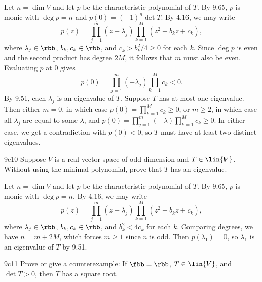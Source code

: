 \begin{sol}
    Let $n = \dim V$ and let $p$ be the characteristic polynomial of $T$.
    By 9.65, $p$ is monic with $\deg p = n$ and $p(0) = (-1)^n \det T$.
    By 4.16, we may write
    \[
        p(z) = \prod_{j=1}^m (z - \lambda_j) \prod_{k=1}^M (z^2 + b_k z + c_k),
    \]
    where $\lambda_j \in \rbb$, $b_k, c_k \in \rbb$, and $c_k > b_k^2/4 \geq 0$ for each $k$.
    Since $\deg p$ is even and the second product has degree $2M$, it follows that $m$ must also be even.
    Evaluating $p$ at $0$ gives
    \[
        p(0) = \prod_{j=1}^m (-\lambda_j) \prod_{k=1}^M c_k < 0.
    \]
    By 9.51, each $\lambda_j$ is an eigenvalue of $T$.
    Suppose $T$ has at most one eigenvalue.
    Then either $m = 0$, in which case $p(0) = \prod_{k=1}^M c_k \geq 0$, or $m \geq 2$, in which case all $\lambda_j$ are equal to some $\lambda$, and $p(0) = \prod_{j=1}^m (-\lambda) \prod_{k=1}^M c_k \geq 0$.
    In either case, we get a contradiction with $p(0) < 0$, so $T$ must have at least two distinct eigenvalues.
\end{sol}

\begin{exercise}{9c10}
    Suppose $V$ is a real vector space of odd dimension and $T \in \lin{V}$.
    Without using the minimal polynomial, prove that $T$ has an eigenvalue.

\end{exercise}

\begin{sol}
    Let $n = \dim V$ and let $p$ be the characteristic polynomial of $T$.
    By 9.65, $p$ is monic with $\deg p = n$.
    By 4.16, we may write
    \[
        p(z) = \prod_{j=1}^m (z - \lambda_j) \prod_{k=1}^M (z^2 + b_k z + c_k),
    \]
    where $\lambda_j \in \rbb$, $b_k, c_k \in \rbb$, and $b_k^2 < 4c_k$ for each $k$.
    Comparing degrees, we have $n = m + 2M$, which forces $m \geq 1$ since $n$ is odd.
    Then $p(\lambda_1) = 0$, so $\lambda_1$ is an eigenvalue of $T$ by 9.51.
\end{sol}

\begin{exercise}{9c11}
    Prove or give a counterexample: If $\fbb = \rbb$, $T \in \lin{V}$, and $\det T > 0$, then $T$ has a square root.

\end{exercise}

